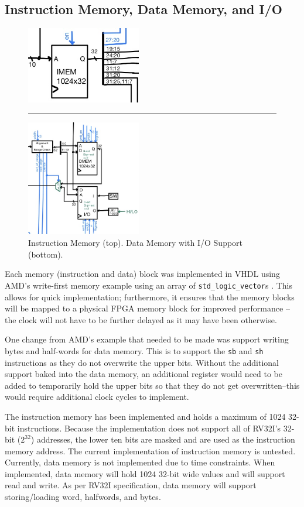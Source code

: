 \documentclass[lettersize,journal]{IEEEtran}
\begin{document}
\subsection{Instruction Memory,  Data Memory, and I/O}
\begin{figure}[!h]
    \label{fig:memory}
    \centering
    \includegraphics[width=5cm]{IMEM.jpg}
    \rule{7cm}{0.8pt}
    \includegraphics[width=5cm]{DMEM-IO.jpg}
    \caption{Instruction Memory (top). Data Memory with I/O Support (bottom).}
\end{figure}

Each memory (instruction and data) block was implemented in VHDL using AMD's write-first memory example using an array of \verb|std_logic_vector|s \cite{amdblockram}.
This allows for quick implementation; furthermore, it ensures that the memory blocks will be mapped to a physical FPGA memory block for improved performance
--the clock will not have to be further delayed as it may have been otherwise.

One change from AMD's example that needed to be made was support writing bytes and half-words for data memory.
This is to support the \verb|sb| and \verb|sh| instructions as they do not overwrite the upper bits.
Without the additional support baked into the data memory,
an additional register would need to be added to temporarily hold the upper bits so that they do not get overwritten--this would require additional clock cycles to implement.

The instruction memory has been implemented and holds a maximum of 1024 32-bit instructions.
Because the implementation does not support all of RV32I's 32-bit ($2^{32}$) addresses, the lower ten bits are masked and are used as the instruction memory address.
The current implementation of instruction memory is untested.
Currently, data memory is not implemented due to time constraints.
When implemented, data memory will hold 1024 32-bit wide values and will support read and write.
As per RV32I specification, data memory will support storing/loading word, halfwords, and bytes.
\color{red}{Incomplete..}\color{black}\\
\end{document}
